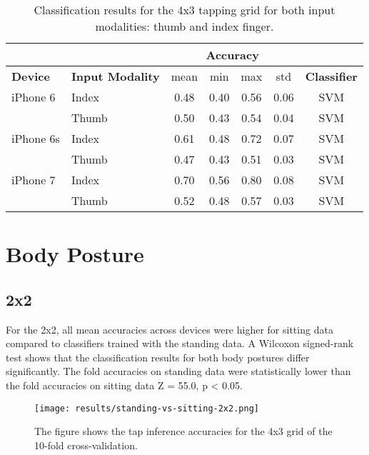   \begin{table}[h!]
    \centering
  \begin{tabular}{|l|l|c|c|c|c|c|}
    \cline{3-6}
    \multicolumn{2}{c}{} & \multicolumn{4}{|c|}{\textbf{Accuracy}}  \\
    \hline
    \textbf{Device} & \textbf{Input Modality} & mean &   min &   max  & std &  \textbf{Classifier} \\
    \hline
    iPhone 6 & Index &      0.48 &     0.40 &     0.56 &     0.06 &  SVM \\
    & Thumb &      0.50 &     0.43 &     0.54 &     0.04 &  SVM \\
    \hline
  iPhone 6s & Index &      0.61 &     0.48 &     0.72 &     0.07 &  SVM \\
    & Thumb &      0.47 &     0.43 &     0.51 &     0.03 &  SVM \\
    \hline
    iPhone 7 & Index &      0.70 &     0.56 &     0.80 &     0.08 &  SVM \\
    & Thumb &      0.52 &     0.48 &     0.57 &     0.03 &  SVM \\
    \hline
  \end{tabular}
    \caption{Classification results for the 4x3 tapping grid for both input modalities: thumb and index finger.}
  \end{table}
  
  \section*{Body Posture}
  \subsection*{2x2}
  For the 2x2, all mean accuracies across devices were higher for sitting data compared to classifiers trained with the standing data. A Wilcoxon signed-rank test shows that the classification results for both body postures differ significantly. The fold accuracies on standing data were statistically lower than the fold accuracies on sitting data Z = 55.0, p < 0.05.
  
  \begin{figure}[h!]
    \centering
    \texttt{[image: results/standing-vs-sitting-2x2.png]}
    \caption*{The figure shows the tap inference accuracies for the 4x3 grid of the 10-fold cross-validation.} \label{fig:participation}
  \end{figure}
  
